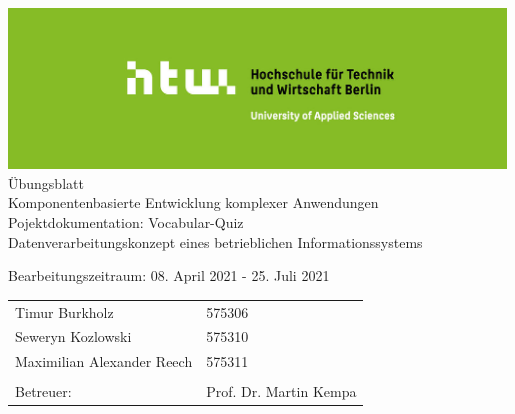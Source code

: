 \linespread{1}
\def\title{Komponentenbasierte Entwicklung komplexer Anwendungen}
\def\author{Timur Burkholz, Seweryn Kozlowski, Maximilian Alexander Reech}
\begin{titlepage}
    \begin{center}
        \includegraphics[width=0.99\textwidth]{Includes/csm_Logos_1330x430_612fe2f37a.jpg}\\
        \vspace{24pt}
        \small{Übungsblatt}\\
        \vspace{48pt}
        \huge{\title{}}\\
        \vspace{24pt}
        \large{Pojektdokumentation: Vocabular-Quiz}\\
        \small{Datenverarbeitungskonzept eines betrieblichen Informationssystems}
        
        \vspace{48pt}
        \small{Bearbeitungszeitraum: 08. April 2021 - 25. Juli 2021}
    \end{center}
    \vspace{96pt}
    \begin{table}[H]
        \centering
        \begin{tabular}{ll}
            \small Timur Burkholz                   & \small 575306\\
            \small Seweryn Kozlowski                & \small 575310\\
            \small Maximilian Alexander Reech       & \small 575311\\
            \\
            \small Betreuer:                        & \small Prof. Dr. Martin Kempa\\
        \end{tabular}
    \end{table}
\end{titlepage}
\clearpage
{}

\tableofcontents
{}

\listoffigures
{}
\clearpage